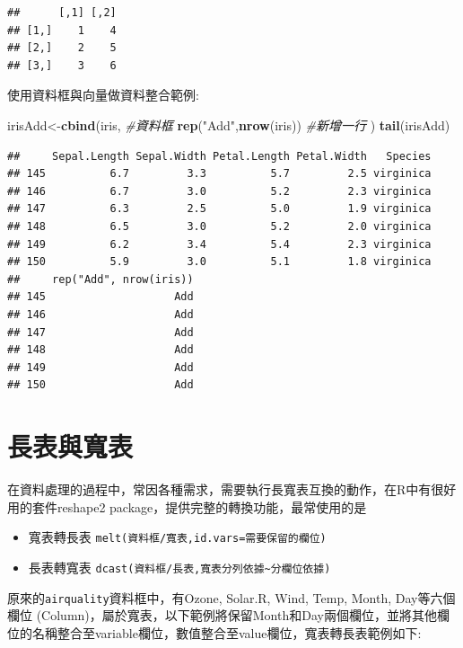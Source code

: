 \documentclass[]{book}
\newenvironment{Shaded}{\begin{snugshade}}{\end{snugshade}}
\newcommand{\KeywordTok}[1]{\textcolor[rgb]{0.13,0.29,0.53}{\textbf{{#1}}}}
\newcommand{\StringTok}[1]{\textcolor[rgb]{0.31,0.60,0.02}{{#1}}}
\newcommand{\CommentTok}[1]{\textcolor[rgb]{0.56,0.35,0.01}{\textit{{#1}}}}
\newcommand{\NormalTok}[1]{{#1}}
\providecommand{\tightlist}{%
  \setlength{\itemsep}{0pt}\setlength{\parskip}{0pt}}
\theoremstyle{definition}
\theoremstyle{definition}
\theoremstyle{remark}
\begin{document}
\begin{verbatim}
##      [,1] [,2]
## [1,]    1    4
## [2,]    2    5
## [3,]    3    6
\end{verbatim}

使用資料框與向量做資料整合範例:

\begin{Shaded}
\begin{Highlighting}[]
\NormalTok{irisAdd<-}\KeywordTok{cbind}\NormalTok{(iris, }\CommentTok{#資料框}
      \KeywordTok{rep}\NormalTok{(}\StringTok{"Add"}\NormalTok{,}\KeywordTok{nrow}\NormalTok{(iris))  }\CommentTok{#新增一行}
      \NormalTok{) }
\KeywordTok{tail}\NormalTok{(irisAdd)}
\end{Highlighting}
\end{Shaded}

\begin{verbatim}
##     Sepal.Length Sepal.Width Petal.Length Petal.Width   Species
## 145          6.7         3.3          5.7         2.5 virginica
## 146          6.7         3.0          5.2         2.3 virginica
## 147          6.3         2.5          5.0         1.9 virginica
## 148          6.5         3.0          5.2         2.0 virginica
## 149          6.2         3.4          5.4         2.3 virginica
## 150          5.9         3.0          5.1         1.8 virginica
##     rep("Add", nrow(iris))
## 145                    Add
## 146                    Add
## 147                    Add
## 148                    Add
## 149                    Add
## 150                    Add
\end{verbatim}

\section{長表與寬表}\label{reshape}

在資料處理的過程中，常因各種需求，需要執行長寬表互換的動作，在R中有很好用的套件reshape2\citep{R-reshape2}
package，提供完整的轉換功能，最常使用的是

\begin{itemize}
\tightlist
\item
  寬表轉長表 \texttt{melt(資料框/寬表,id.vars=需要保留的欄位)}
\item
  長表轉寬表
  \texttt{dcast(資料框/長表,寬表分列依據\textasciitilde{}分欄位依據)}
\end{itemize}

原來的\texttt{airquality}資料框中，有Ozone, Solar.R, Wind, Temp, Month,
Day等六個欄位
(Column)，屬於寬表，以下範例將保留Month和Day兩個欄位，並將其他欄位的名稱整合至variable欄位，數值整合至value欄位，寬表轉長表範例如下:
\end{document}
